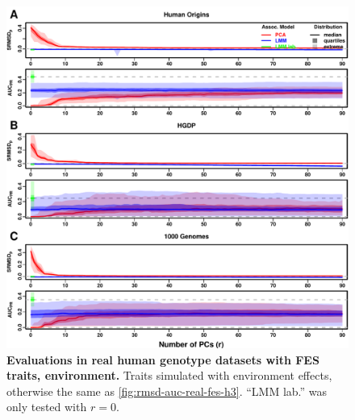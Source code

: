 \documentclass[11pt]{article}
\begin{document}
\begin{figure}[hp!]
  \centering
  \includegraphics[width=\textwidth,height=\textheight,keepaspectratio]{fes/m_causal_fac-27/h0.3/env0.3-0.2/rmsd-auc-real.pdf}
  \caption{
    {\bf Evaluations in real human genotype datasets with FES traits, environment.}
    Traits simulated with environment effects, otherwise the same as \cref{fig:rmsd-auc-real-fes-h3}.
    ``LMM lab.'' was only tested with $r=0$.
  }
  \label{fig:rmsd-auc-real-fes-env}
\end{figure}
\end{document}
